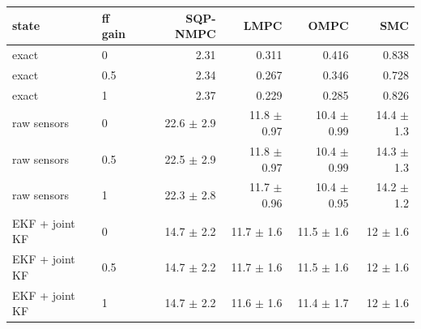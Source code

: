 \begin{tabular}{llrrrr}
\toprule
state & ff gain & SQP-NMPC & LMPC & OMPC & SMC \\
\midrule
exact & 0 & 2.31 & 0.311 & 0.416 & 0.838 \\
exact & 0.5 & 2.34 & 0.267 & 0.346 & 0.728 \\
exact & 1 & 2.37 & 0.229 & 0.285 & 0.826 \\
\addlinespace
raw sensors & 0 & 22.6 $\pm$ 2.9 & 11.8 $\pm$ 0.97 & 10.4 $\pm$ 0.99 & 14.4 $\pm$ 1.3 \\
raw sensors & 0.5 & 22.5 $\pm$ 2.9 & 11.8 $\pm$ 0.97 & 10.4 $\pm$ 0.99 & 14.3 $\pm$ 1.3 \\
raw sensors & 1 & 22.3 $\pm$ 2.8 & 11.7 $\pm$ 0.96 & 10.4 $\pm$ 0.95 & 14.2 $\pm$ 1.2 \\
\addlinespace
EKF + joint KF & 0 & 14.7 $\pm$ 2.2 & 11.7 $\pm$ 1.6 & 11.5 $\pm$ 1.6 & 12 $\pm$ 1.6 \\
EKF + joint KF & 0.5 & 14.7 $\pm$ 2.2 & 11.7 $\pm$ 1.6 & 11.5 $\pm$ 1.6 & 12 $\pm$ 1.6 \\
EKF + joint KF & 1 & 14.7 $\pm$ 2.2 & 11.6 $\pm$ 1.6 & 11.4 $\pm$ 1.7 & 12 $\pm$ 1.6 \\
\bottomrule
\end{tabular}
